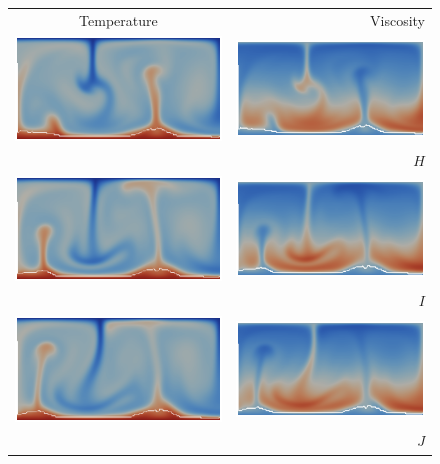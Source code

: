 \begin{figure}
\begin{center}
\begin{tabular}{c r}
Temperature & Viscosity \\
\includegraphics[width=0.45\columnwidth]{chapters/vynnytska/png/tmH.png} &
\includegraphics[width=0.45\columnwidth]{chapters/vynnytska/png/visH.png} \\ & $H$ \\
\includegraphics[width=0.45\columnwidth]{chapters/vynnytska/png/tmI.png} &
\includegraphics[width=0.45\columnwidth]{chapters/vynnytska/png/visI.png} \\ & $I$ \\
\includegraphics[width=0.45\columnwidth]{chapters/vynnytska/png/tmJ.png} &
\includegraphics[width=0.45\columnwidth]{chapters/vynnytska/png/visJ.png} \\& $J$ \\

\end{tabular}
\end{center}
\end{figure}
